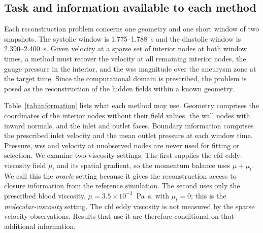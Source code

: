 \documentclass[12pt,a4paper]{article}
\newcommand{\CFD}{\ac{cfd}\xspace}
\newcommand{\WSS}{\ac{wss}\xspace}
\theoremstyle{definition}
\numberwithin{equation}{section}
\begin{document}
\subsection{Task and information available to each method}
\label{sec:task}
Each reconstruction problem concerns one geometry and one short window of two snapshots. %
The systolic window is 1.775--1.788~s and the diastolic window is 2.390--2.400~s. Given velocity at a sparse set of interior nodes at both window times, a method must recover the velocity at all remaining interior nodes, the gauge pressure in the interior, and the \WSS magnitude over the aneurysm zone at the target time. Since the computational domain is prescribed, the problem is posed as the reconstruction of the hidden fields within a known geometry.

Table~\ref{tab:information} lists what each method may use. Geometry comprises the coordinates of the interior nodes without their field values, the wall nodes with inward normals, and the inlet and outlet faces. Boundary information comprises the prescribed inlet velocity and the mean outlet pressure at each window time. Pressure, \WSS and velocity at unobserved nodes are never used for fitting or selection. We examine two viscosity settings. The first supplies the \CFD eddy-viscosity field $\mu_t$ and its spatial gradient, so the momentum balance uses $\mu+\mu_t$. We call this the \emph{oracle} setting because it gives the reconstruction access to closure information from the reference simulation. The second uses only the prescribed blood viscosity, $\mu=3.5\times10^{-3}$~Pa~s, with $\mu_t=0$; this is the \emph{molecular-viscosity} setting. The \CFD eddy viscosity is not measured by the sparse velocity observations. Results that use it are therefore conditional on that additional information.
\end{document}
